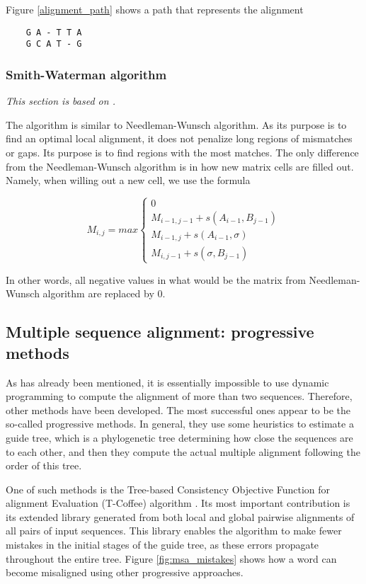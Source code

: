 Figure \ref{alignment_path} shows a path that represents the alignment

\begin{verbatim}
    G A - T T A
    G C A T - G
\end{verbatim}

\subsubsection{Smith-Waterman algorithm}

\emph{This section is based on \cite{smith_waterman}.}

The algorithm is similar to Needleman-Wunsch algorithm. As its purpose is to find an optimal local alignment, it does not
penalize long regions of mismatches or gaps. Its purpose is to find regions with the most matches. The only difference from the Needle\-man-Wunsch 
algorithm is in how new matrix cells are filled out. Namely, when willing out a new cell, we use the formula

\[ M_{i, j} = max
    \begin{cases}
        0   \\
        M_{i-1, j-1} + s(A_{i-1}, B_{j-1}) \\
        M_{i-1, j} + s(A_{i-1}, \sigma)    \\
        M_{i, j-1} + s(\sigma, B_{j-1})
    \end{cases}
\]

In other words, all negative values in what would be the matrix from Needle\-man-Wunsch algorithm are replaced by 0.

\subsection{Multiple sequence alignment: progressive methods}

As has already been mentioned, it is essentially impossible to use dynamic programming to compute the alignment of more than two sequences.
Therefore, other methods have been developed. The most successful ones appear to be the so-called progressive methods. In general,
they use some heuristics to estimate a guide tree, which is a phylogenetic tree determining how close the sequences are to each other,
and then they compute the actual multiple alignment following the order of this tree.

One of such methods is the Tree-based Consistency Objective Function for alignment Evaluation (T-Coffee) algorithm \citep{t_coffee}.
Its most important contribution is its extended library generated from both local and global pairwise alignments of all pairs of input sequences.
This library enables the algorithm to make fewer mistakes in the initial stages of the guide tree, as these errors propagate throughout the entire tree.
Figure \ref{fig:msa_mistakes} shows how a word can become misaligned using other progressive approaches.


